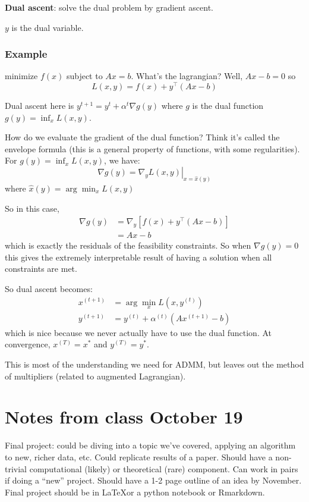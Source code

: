 \documentclass{article}
\begin{document}
{\textbf{Dual ascent}}: solve the dual problem by gradient ascent.

$y$ is the dual variable.
\subsubsection{Example}
minimize $f(x)$ subject to $Ax=b$. What's the lagrangian? Well, $Ax-b=0$ so
$$L(x, y)=f(x)+y^\top (Ax-b)$$

Dual ascent here is $y^{t+1}=y^t + \alpha^t \nabla g(y)$ where $g$ is the dual function $g(y)=\inf_x L(x, y)$.

How do we evaluate the gradient of the dual function? Think it's called the envelope formula (this is a general property of functions, with some regularities). For $g(y)=\inf_x L(x, y)$, we have:
$$\nabla g(y)=\left.\nabla_yL(x,y)\right|_{x=\hat{x}(y)}$$ where $\hat{x}(y)=\arg\min_x L(x, y)$

So in this case,
\begin{align*}
\nabla g(y)&=\nabla_y \left[f(x) + y^\top(Ax-b)\right]\\
&=Ax-b
\end{align*}
which is exactly the residuals of the feasibility constraints. So when $\nabla g(y)=0$ this gives the extremely interpretable result of having a solution when all constraints are met.

So dual ascent becomes:
\begin{align*}
x^{(t+1)}&=\arg\min_x L(x, y^{(t)})\\
y^{(t+1)}&=y^{(t)} + \alpha^{(t)} \left(Ax^{(t+1)}-b\right)
\end{align*}
which is nice because we never actually have to use the dual function. At convergence, $x^{(T)}=x^*$ and $y^{(T)}=y^*$.

This is most of the understanding we need for ADMM, but leaves out the method of multipliers (related to augmented Lagrangian).

\section{Notes from class October 19}

Final project: could be diving into a topic we've covered, applying an algorithm to new, richer data, etc. Could replicate
results of a paper. Should have a non-trivial computational (likely) or theoretical (rare) component. Can work in pairs
if doing a ``new'' project. Should have a 1-2 page outline of an idea by November. Final project should be in \LaTeX or
a python notebook or Rmarkdown.
\end{document}
